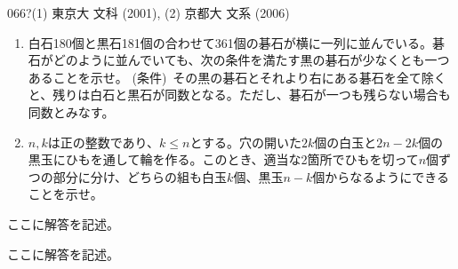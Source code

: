 \begin{thm}{066}{\hosi ?}{(1) 東京大 文科 (2001), (2) 京都大 文系 (2006)}
 \begin{enumerate}
  \item 白石180個と黒石181個の合わせて361個の碁石が横に一列に並んでいる。碁石がどのように並んでいても、次の条件を満たす黒の碁石が少なくとも一つあることを示せ。
	(条件)~その黒の碁石とそれより右にある碁石を全て除くと、残りは白石と黒石が同数となる。ただし、碁石が一つも残らない場合も同数とみなす。
  \item $n, k$は正の整数であり、$k\le n$とする。穴の開いた$2k$個の白玉と$2n-2k$個の黒玉にひもを通して輪を作る。このとき、適当な2箇所でひもを切って$n$個ずつの部分に分け、どちらの組も白玉$k$個、黒玉$n-k$個からなるようにできることを示せ。
 \end{enumerate}
\end{thm}

ここに解答を記述。

ここに解答を記述。